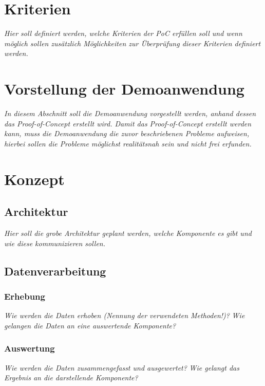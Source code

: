 	
\section{Kriterien}

	\textit{Hier soll definiert werden, welche Kriterien der PoC erfüllen soll und wenn möglich sollen zusätzlich Möglichkeiten zur Überprüfung dieser Kriterien definiert werden.}
	
\section{Vorstellung der Demoanwendung}

	\textit{In diesem Abschnitt soll die Demoanwendung vorgestellt werden, anhand dessen das Proof-of-Concept erstellt wird. Damit das Proof-of-Concept erstellt werden kann, muss die Demoanwendung die zuvor beschriebenen Probleme aufweisen, hierbei sollen die Probleme möglichst realitätsnah sein und nicht frei erfunden.}
	
\section{Konzept}
	
	\subsection{Architektur}

	\textit{Hier soll die grobe Architektur geplant werden, welche Komponente es gibt und wie diese kommunizieren sollen.}
	
	\subsection{Datenverarbeitung}
		
		\subsubsection{Erhebung}
		\textit{Wie werden die Daten erhoben (Nennung der verwendeten Methoden!)?}
		\textit{Wie gelangen die Daten an eine auswertende Komponente?}
		
		\subsubsection{Auswertung}
		\textit{Wie werden die Daten zusammengefasst und ausgewertet?}
		\textit{Wie gelangt das Ergebnis an die darstellende Komponente?}
		
